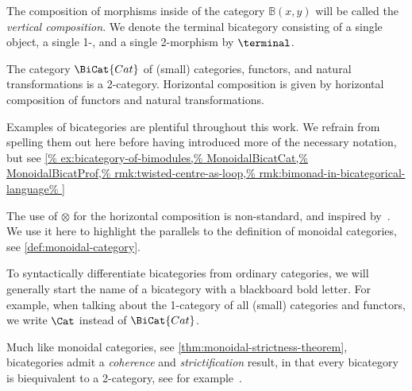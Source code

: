 The composition of morphisms inside of the category \(\mathbb{B}(x,y)\) will be called the \emph{vertical composition}.
We denote the terminal bicategory
consisting of a single object, a single 1-, and a single 2-morphism
by \(\terminal\).

\begin{example}\label{ex:cat-is-a-bicategory}
  The category \(\BiCat{Cat}\) of (small) categories, functors, and natural transformations is a 2-category.
  Horizontal composition is given by horizontal composition of functors and natural transformations.
\end{example}

Examples of bicategories are plentiful throughout this work.
We refrain from spelling them out here
before having introduced more of the necessary notation,
but see
\cref{%
  ex:bicategory-of-bimodules,%
  MonoidalBicatCat,%
  MonoidalBicatProf,%
  rmk:twisted-centre-as-loop,%
  rmk:bimonad-in-bicategorical-language%
}

\begin{remark}
  The use of \(\otimes\) for the horizontal composition is non-standard,
  and inspired by~\cite{garner22}.
  We use it here to highlight the parallels to the definition of monoidal categories,
  see \cref{def:monoidal-category}.
\end{remark}

\begin{notation}
  To syntactically differentiate bicategories from ordinary categories,
  we will generally start the name of a bicategory with a blackboard bold letter.
  For example, when talking about the 1-category of all (small) categories and functors,
  we write \(\Cat\) instead of \(\BiCat{Cat}\).
\end{notation}

Much like monoidal categories,
see \cref{thm:monoidal-strictness-theorem},
bicategories admit a \emph{coherence} and \emph{strictification} result,
in that every bicategory is biequivalent to a 2-category,
see for example~\cite[Theorem~8.4.1 and~Corollary~8.4.2]{johnson-yau2021:TwoDimensionalCategories}.

